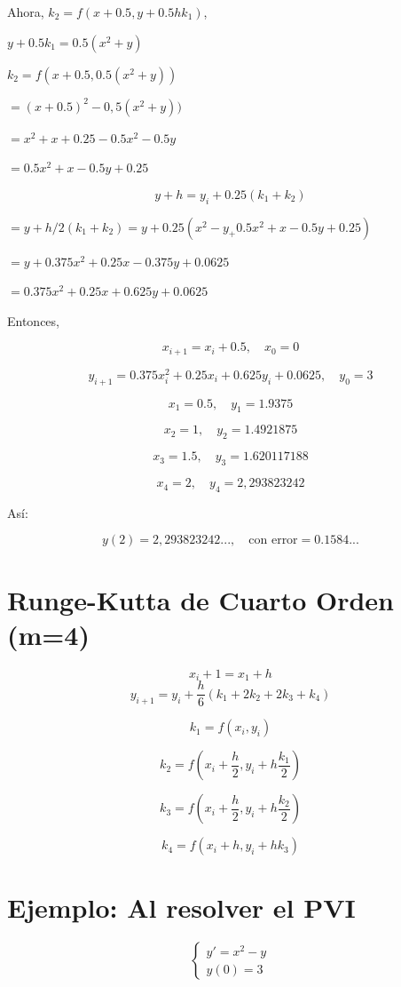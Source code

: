 \documentclass[12pt,letterpaper]{article}
\begin{document}
Ahora, \( k_2 = f(x + 0.5, y + 0.5hk_1) \),


\( y + 0.5k_1 = 0.5(x^2 + y) \)

\(
k_2 = f(x + 0.5, 0.5(x^2 + y) )
\)

\(
= (x + 0.5)^2 - 0,5(x^2 + y) )
\)

\(
= x^2 + x + 0.25 - 0.5x^2 - 0.5y
\)

\(
= 0.5x^2 + x - 0.5y + 0.25
\)

\[
y + h = y_i + 0.25(k_1 + k_2)
\]

\(
= y + h/2(k_1 + k_2) = y + 0.25 (x^2 - y_ + 0.5x^2 + x - 0.5y + 0.25)
\)

\(
= y + 0.375x^2 + 0.25x - 0.375y + 0.0625
\)

\(
= 0.375x^2 + 0.25x + 0.625y + 0.0625
\)

Entonces,

\[
x_{i+1} = x_i + 0.5, \quad x_0 = 0
\]

\[
y_{i+1} = 0.375x_i^2 + 0.25x_i + 0.625y_i + 0.0625, \quad y_0 = 3
\]

\[
x_1 = 0.5, \quad y_1 = 1.9375
\]

\[
x_2 = 1, \quad y_2 = 1.4921875
\]

\[
x_3 = 1.5, \quad y_3 = 1.620117188
\]

\[
x_4 = 2, \quad y_4 = 2,293823242
\]

Así:

\[
y(2) = 2,293823242..., \quad \text{con error} = 0.1584...
\]

\section*{Runge-Kutta de Cuarto Orden (m=4)}

\[
x_i+1 = x_1+h
\]
\[
y_{i+1} = y_i + \frac{h}{6}(k_1 + 2k_2 + 2k_3 + k_4)
\]

\[
k_1 = f(x_i, y_i)
\]

\[
k_2 = f(x_i + \frac{h}{2}, y_i + h \frac{k_1}2)
\]

\[
k_3 = f(x_i + \frac{h}{2}, y_i + h \frac{k_2}2)
\]

\[
k_4 = f(x_i + h, y_i + hk_3)
\]

\section*{Ejemplo: Al resolver el PVI}
\[
\begin{cases}
y' = x^2 - y \\
y(0) = 3
\end{cases}
\]
\end{document}
